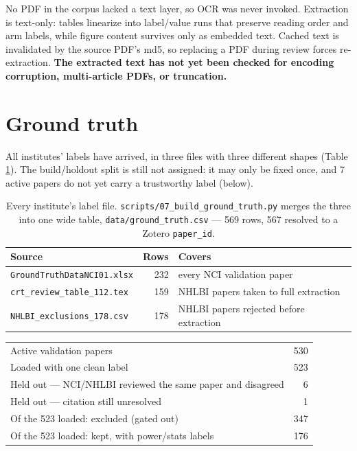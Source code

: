 \documentclass[11pt]{article}
\begin{document}
No PDF in the corpus lacked a text layer, so OCR was never invoked. Extraction is text-only: tables
linearize into label/value runs that preserve reading order and arm labels, while figure content survives
only as embedded text. Cached text is invalidated by the source PDF's md5, so replacing a PDF during
review forces re-extraction. \textbf{The extracted text has not yet been checked for encoding corruption,
multi-article PDFs, or truncation.}

\section{Ground truth}

All institutes' labels have arrived, in three files with three different shapes (Table
\ref{tab:gt-sources}). The build/holdout split is still not assigned: it may only be fixed once, and
7 active papers do not yet carry a trustworthy label (below).

\begin{table}[h]
\centering
\begin{tabular}{lrl}
\toprule
\textbf{Source} & \textbf{Rows} & \textbf{Covers} \\
\midrule
\texttt{GroundTruthDataNCI01.xlsx} & 232 & every NCI validation paper \\
\texttt{crt\_review\_table\_112.tex} & 159 & NHLBI papers taken to full extraction \\
\texttt{NHLBI\_exclusions\_178.csv} & 178 & NHLBI papers rejected before extraction \\
\bottomrule
\end{tabular}
\caption{Every institute's label file. \texttt{scripts/07\_build\_ground\_truth.py} merges the three
into one wide table, \texttt{data/ground\_truth.csv} --- 569 rows, 567 resolved to a Zotero
\texttt{paper\_id}.}
\label{tab:gt-sources}
\end{table}

\begin{table}[h]
\centering
\begin{tabular}{lr}
\toprule
Active validation papers & 530 \\
\quad Loaded with one clean label & 523 \\
\quad Held out --- NCI/NHLBI reviewed the same paper and disagreed & 6 \\
\quad Held out --- citation still unresolved & 1 \\
\midrule
Of the 523 loaded: excluded (gated out) & 347 \\
Of the 523 loaded: kept, with power/stats labels & 176 \\
\bottomrule
\end{tabular}
\end{table}
\end{document}
